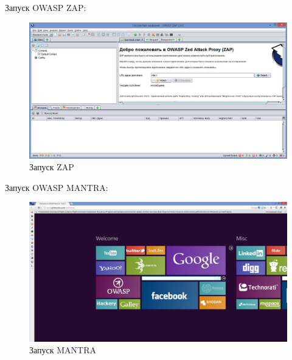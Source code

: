 \documentclass[10pt,a4paper]{article}
\begin{document}
Запуск OWASP ZAP:
\begin{figure}[h!]
\centering
\includegraphics[scale=0.4]{Zap.jpg}
\caption{Запуск ZAP}
\end{figure}

Запуск OWASP MANTRA:
\begin{figure}[h!]
\centering
\includegraphics[scale=0.3]{Mantra.jpg}
\caption{Запуск MANTRA}
\end{figure}
\end{document}
